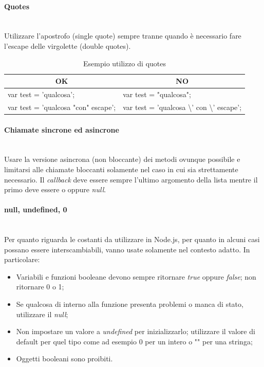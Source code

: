 \paragraph{Quotes}\mbox{}\\[0.4cm]
Utilizzare l'apostrofo (single quote) sempre tranne quando è necessario fare l'escape delle virgolette (double quotes).
\begin{table} [H]
	\begin{center}
		\begin{tabular}{ | l | l |}
			\multicolumn{1}{c}{\textbf{OK}}&\multicolumn{1}{c}{\textbf{NO}}\\ 
			\hline
			var test = 'qualcosa'; & var test = "qualcosa"; \\
			var test = 'qualcosa "con" escape'; & var test = 'qualcosa \textbackslash' con \textbackslash' escape';\\
			\hline
		\end{tabular}
	\end{center}
	\caption{Esempio utilizzo di quotes}
\end{table}

\paragraph{Chiamate sincrone ed asincrone}\mbox{}\\[0.4cm]
Usare la versione asincrona (non bloccante) dei metodi ovunque possibile e limitarsi alle chiamate bloccanti solamente nel caso in cui sia strettamente necessario. Il \textit{callback} deve essere sempre l'ultimo argomento della lista mentre il primo deve essere o  oppure \textit{null}.

\paragraph{null, undefined, 0}\mbox{}\\[0.4cm]
Per quanto riguarda le costanti da utilizzare in Node.js, per quanto in alcuni casi possano essere interscambiabili, vanno usate solamente nel contesto adatto. In particolare:

\begin{itemize}
    \item Variabili e funzioni booleane devono sempre ritornare \textit{true} oppure \textit{false}; non ritornare 0 o 1;
    \item Se qualcosa di interno alla funzione presenta problemi o manca di stato, utilizzare il \textit{null};
    \item Non impostare un valore a \textit{undefined} per inizializzarlo; utilizzare il valore di default per quel tipo come ad esempio 0 per un intero o "" per una stringa;
    \item Oggetti booleani sono proibiti.
\end{itemize}